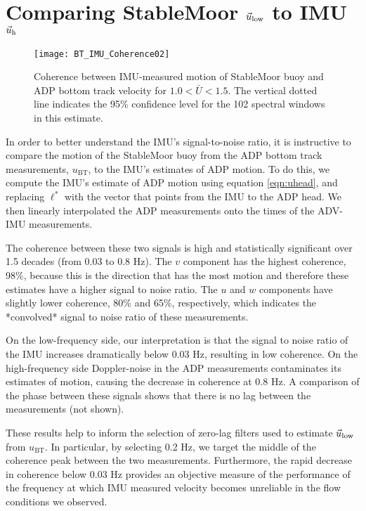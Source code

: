 \section{Comparing StableMoor $\vec{u}_\mathrm{low}$ to IMU $\vec{u}_\mathrm{h}$}
\label{apdx:ulow}

\def\ubt{\ensuremath{u_\mathrm{BT}}}

\begin{figure}[t]
  \centering
  \texttt{[image: BT\_IMU\_Coherence02]}
  \caption{Coherence between IMU-measured motion of StableMoor buoy and ADP bottom track velocity for $1.0<\bar{U}<1.5$. The vertical dotted line indicates the 95\% confidence level for the 102 spectral windows in this estimate.}
  \label{fig:SM_coh}
\end{figure}

In order to better understand the IMU's signal-to-noise ratio, it is instructive to compare the motion of the StableMoor buoy from the ADP bottom track measurements, $\ubt$, to the IMU's estimates of ADP motion. To do this, we compute the IMU's estimate of ADP motion using equation \eqref{eqn:uhead}, and replacing $\ell^{*}$ with the vector that points from the IMU to the ADP head. We then linearly interpolated the ADP measurements onto the times of the ADV-IMU measurements.

The coherence between these two signals is high and statistically significant over 1.5 decades (from 0.03 to 0.8 Hz). The $v$ component has the highest coherence, 98\%, because this is the direction that has the most motion and therefore these estimates have a higher signal to noise ratio.  The $u$ and $w$ components have slightly lower coherence, 80\% and 65\%, respectively, which indicates the *convolved* signal to noise ratio of these measurements.

On the low-frequency side, our interpretation is that the signal to noise ratio of the IMU increases dramatically below 0.03 Hz, resulting in low coherence. On the high-frequency side Doppler-noise in the ADP measurements contaminates its estimates of motion, causing the decrease in coherence at 0.8 Hz. A comparison of the phase between these signals shows that there is no lag between the measurements (not shown).

These results help to inform the selection of zero-lag filters used to estimate $\vec{u}_\mathrm{low}$ from $\ubt$. In particular, by selecting 0.2 Hz, we target the middle of the coherence peak between the two measurements. Furthermore, the rapid decrease in coherence below 0.03 Hz provides an objective measure of the performance of the frequency at which IMU measured velocity becomes unreliable in the flow conditions we observed. 



